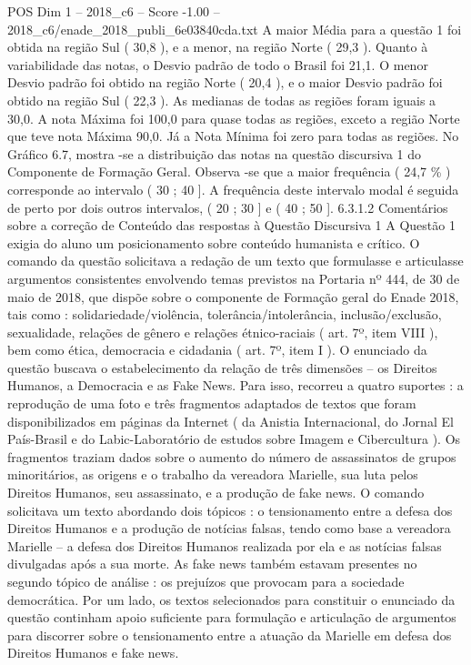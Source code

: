 \begin{textsample}{POS Dim 1 – 2018\_c6 – Score -1.00 – 2018\_c6/enade\_2018\_publi\_6e03840cda.txt}
A maior Média para a questão 1 foi obtida na região Sul ( 30,8 ), e a menor, na região Norte ( 29,3 ).
Quanto à variabilidade das notas, o Desvio padrão de todo o Brasil foi 21,1.
O menor Desvio padrão foi obtido na região Norte ( 20,4 ), e o maior Desvio padrão foi obtido na região Sul ( 22,3 ).
As medianas de todas as regiões foram iguais a 30,0.
A nota Máxima foi 100,0 para quase todas as regiões, exceto a região Norte que teve nota Máxima 90,0.
Já a Nota Mínima foi zero para todas as regiões.
No Gráfico 6.7, mostra -se a distribuição das notas na questão discursiva 1 do Componente de Formação Geral.
Observa -se que a maior frequência ( 24,7 \% ) corresponde ao intervalo ( 30 ; 40 ].
A frequência deste intervalo modal é seguida de perto por dois outros intervalos, ( 20 ; 30 ] e ( 40 ; 50 ]. 6.3.1.2 Comentários sobre a correção de Conteúdo das respostas à Questão Discursiva 1 A Questão 1 exigia do aluno um posicionamento sobre conteúdo humanista e crítico.
O comando da questão solicitava a redação de um texto que formulasse e articulasse argumentos consistentes envolvendo temas previstos na Portaria nº 444, de 30 de maio de 2018, que dispõe sobre o componente de Formação geral do Enade 2018, tais como : solidariedade/violência, tolerância/intolerância, inclusão/exclusão, sexualidade, relações de gênero e relações étnico-raciais ( art. 7º, item VIII ), bem como ética, democracia e cidadania ( art. 7º, item I ).
O enunciado da questão buscava o estabelecimento da relação de três dimensões – os Direitos Humanos, a Democracia e as Fake News.
Para isso, recorreu a quatro suportes : a reprodução de uma foto e três fragmentos adaptados de textos que foram disponibilizados em páginas da Internet ( da Anistia Internacional, do Jornal El País-Brasil e do Labic-Laboratório de estudos sobre Imagem e Cibercultura ).
Os fragmentos traziam dados sobre o aumento do número de assassinatos de grupos minoritários, as origens e o trabalho da vereadora Marielle, sua luta pelos Direitos Humanos, seu assassinato, e a produção de fake news.
O comando solicitava um texto abordando dois tópicos : o tensionamento entre a defesa dos Direitos Humanos e a produção de notícias falsas, tendo como base a vereadora Marielle – a defesa dos Direitos Humanos realizada por ela e as notícias falsas divulgadas após a sua morte.
As fake news também estavam presentes no segundo tópico de análise : os prejuízos que provocam para a sociedade democrática.
Por um lado, os textos selecionados para constituir o enunciado da questão continham apoio suficiente para formulação e articulação de argumentos para discorrer sobre o tensionamento entre a atuação da Marielle em defesa dos Direitos Humanos e fake news.

\end{textsample}
